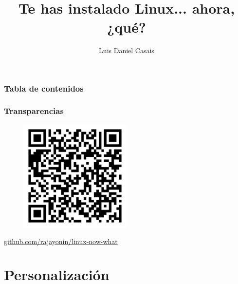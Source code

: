 \documentclass[aspectratio=43]{beamer}
\title{Te has instalado Linux... ahora, ¿qué?} %
\author{Luis Daniel Casais} %
\institute{\edicion \ Jornadas Técnicas del GUL}
\date{\fecha}
\begin{document}
{
    \begin{frame}
        \titlepage
    \end{frame}
}
\addtocounter{framenumber}{-1}


\begin{frame}
    \frametitle{Tabla de contenidos}
    \begin{multicols}{2}
        \tableofcontents
    \end{multicols}
\end{frame}





\begin{frame}
    \frametitle{Transparencias}
    \centering
    
    \begin{figure}
        \includegraphics[width=0.5\textwidth]{img/qr-code.png}
    \end{figure}

    \href{https://github.com/rajayonin/linux-now-what}{github.com/rajayonin/linux-now-what}

\end{frame}


\section{Personalización}
\end{document}
